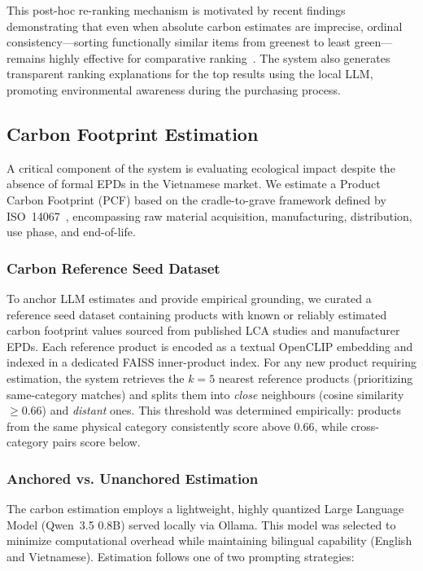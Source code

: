 \documentclass[conference]{IEEEtran}
\begin{document}
This post-hoc re-ranking mechanism is motivated by recent findings demonstrating that even when absolute carbon estimates are imprecise, ordinal consistency---sorting functionally similar items from greenest to least green---remains highly effective for comparative ranking~\cite{ecommerce_carbon, carbon_reranking}. The system also generates transparent ranking explanations for the top results using the local LLM, promoting environmental awareness during the purchasing process.

\subsection{Carbon Footprint Estimation}

A critical component of the system is evaluating ecological impact despite the absence of formal EPDs in the Vietnamese market. We estimate a Product Carbon Footprint (PCF) based on the cradle-to-grave framework defined by ISO~14067~\cite{iso14067}, encompassing raw material acquisition, manufacturing, distribution, use phase, and end-of-life.

\subsubsection{Carbon Reference Seed Dataset}

To anchor LLM estimates and provide empirical grounding, we curated a reference seed dataset containing products with known or reliably estimated carbon footprint values sourced from published LCA studies and manufacturer EPDs. Each reference product is encoded as a textual OpenCLIP embedding and indexed in a dedicated FAISS inner-product index. For any new product requiring estimation, the system retrieves the $k = 5$ nearest reference products (prioritizing same-category matches) and splits them into \textit{close} neighbours (cosine similarity $\geq 0.66$) and \textit{distant} ones. This threshold was determined empirically: products from the same physical category consistently score above 0.66, while cross-category pairs score below.

\subsubsection{Anchored vs. Unanchored Estimation}

The carbon estimation employs a lightweight, highly quantized Large Language Model (Qwen~3.5 0.8B) served locally via Ollama. This model was selected to minimize computational overhead while maintaining bilingual capability (English and Vietnamese). Estimation follows one of two prompting strategies:
\end{document}
